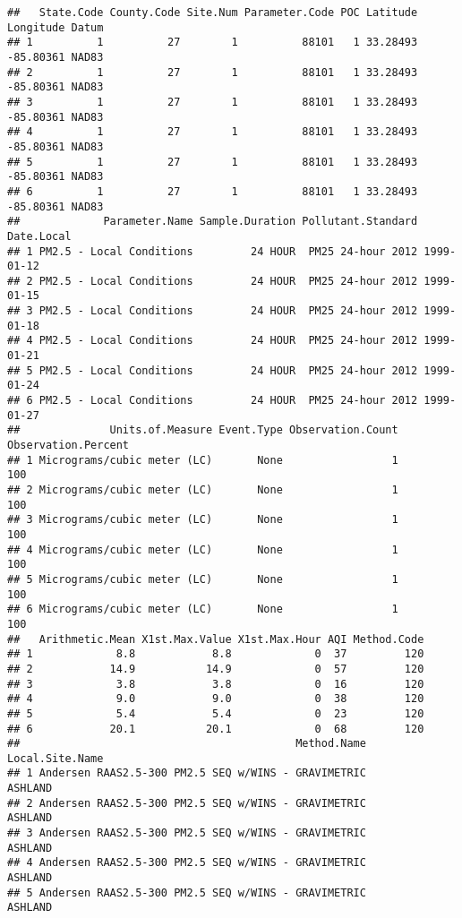 \documentclass[
]{article}
\begin{document}
\begin{verbatim}
##   State.Code County.Code Site.Num Parameter.Code POC Latitude Longitude Datum
## 1          1          27        1          88101   1 33.28493 -85.80361 NAD83
## 2          1          27        1          88101   1 33.28493 -85.80361 NAD83
## 3          1          27        1          88101   1 33.28493 -85.80361 NAD83
## 4          1          27        1          88101   1 33.28493 -85.80361 NAD83
## 5          1          27        1          88101   1 33.28493 -85.80361 NAD83
## 6          1          27        1          88101   1 33.28493 -85.80361 NAD83
##             Parameter.Name Sample.Duration Pollutant.Standard Date.Local
## 1 PM2.5 - Local Conditions         24 HOUR  PM25 24-hour 2012 1999-01-12
## 2 PM2.5 - Local Conditions         24 HOUR  PM25 24-hour 2012 1999-01-15
## 3 PM2.5 - Local Conditions         24 HOUR  PM25 24-hour 2012 1999-01-18
## 4 PM2.5 - Local Conditions         24 HOUR  PM25 24-hour 2012 1999-01-21
## 5 PM2.5 - Local Conditions         24 HOUR  PM25 24-hour 2012 1999-01-24
## 6 PM2.5 - Local Conditions         24 HOUR  PM25 24-hour 2012 1999-01-27
##              Units.of.Measure Event.Type Observation.Count Observation.Percent
## 1 Micrograms/cubic meter (LC)       None                 1                 100
## 2 Micrograms/cubic meter (LC)       None                 1                 100
## 3 Micrograms/cubic meter (LC)       None                 1                 100
## 4 Micrograms/cubic meter (LC)       None                 1                 100
## 5 Micrograms/cubic meter (LC)       None                 1                 100
## 6 Micrograms/cubic meter (LC)       None                 1                 100
##   Arithmetic.Mean X1st.Max.Value X1st.Max.Hour AQI Method.Code
## 1             8.8            8.8             0  37         120
## 2            14.9           14.9             0  57         120
## 3             3.8            3.8             0  16         120
## 4             9.0            9.0             0  38         120
## 5             5.4            5.4             0  23         120
## 6            20.1           20.1             0  68         120
##                                           Method.Name Local.Site.Name
## 1 Andersen RAAS2.5-300 PM2.5 SEQ w/WINS - GRAVIMETRIC         ASHLAND
## 2 Andersen RAAS2.5-300 PM2.5 SEQ w/WINS - GRAVIMETRIC         ASHLAND
## 3 Andersen RAAS2.5-300 PM2.5 SEQ w/WINS - GRAVIMETRIC         ASHLAND
## 4 Andersen RAAS2.5-300 PM2.5 SEQ w/WINS - GRAVIMETRIC         ASHLAND
## 5 Andersen RAAS2.5-300 PM2.5 SEQ w/WINS - GRAVIMETRIC         ASHLAND

\end{verbatim}
\end{document}
